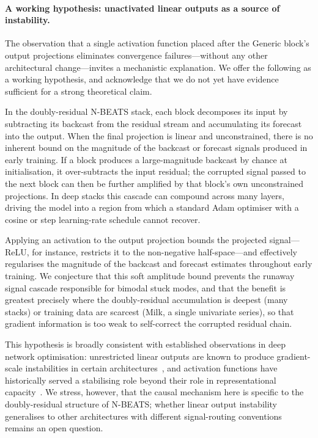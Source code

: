 \documentclass[11pt,a4paper]{article}
\begin{document}
\paragraph{A working hypothesis: unactivated linear outputs as a source of instability.}
The observation that a single activation function placed after the Generic block's output projections eliminates convergence failures---without any other architectural change---invites a mechanistic explanation. We offer the following as a working hypothesis, and acknowledge that we do not yet have evidence sufficient for a strong theoretical claim.

In the doubly-residual N-BEATS stack, each block decomposes its input by subtracting its backcast from the residual stream and accumulating its forecast into the output. When the final projection is linear and unconstrained, there is no inherent bound on the magnitude of the backcast or forecast signals produced in early training. If a block produces a large-magnitude backcast by chance at initialisation, it over-subtracts the input residual; the corrupted signal passed to the next block can then be further amplified by that block's own unconstrained projections. In deep stacks this cascade can compound across many layers, driving the model into a region from which a standard Adam optimiser with a cosine or step learning-rate schedule cannot recover.

Applying an activation to the output projection bounds the projected signal---ReLU, for instance, restricts it to the non-negative half-space---and effectively regularises the magnitude of the backcast and forecast estimates throughout early training. We conjecture that this soft amplitude bound prevents the runaway signal cascade responsible for bimodal stuck modes, and that the benefit is greatest precisely where the doubly-residual accumulation is deepest (many stacks) or training data are scarcest (Milk, a single univariate series), so that gradient information is too weak to self-correct the corrupted residual chain.

This hypothesis is broadly consistent with established observations in deep network optimisation: unrestricted linear outputs are known to produce gradient-scale instabilities in certain architectures~\citep{hochreiter1991untersuchungen,pascanu2013difficulty}, and activation functions have historically served a stabilising role beyond their role in representational capacity~\citep{glorot2011deep}. We stress, however, that the causal mechanism here is specific to the doubly-residual structure of N-BEATS; whether linear output instability generalises to other architectures with different signal-routing conventions remains an open question.
\end{document}
